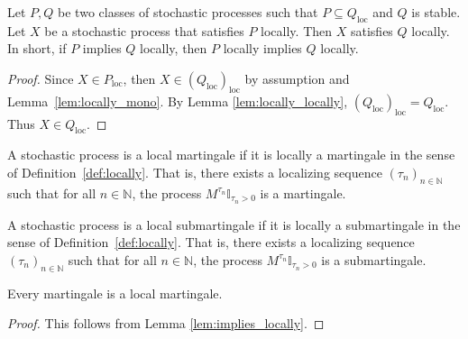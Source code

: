 \begin{lemma}\label{lem:local_induction}
  \leanok
Let $P, Q$ be two classes of stochastic processes such that $P \subseteq Q_{\mathrm{loc}}$ and $Q$ is stable.
Let $X$ be a stochastic process that satisfies $P$ locally.
Then $X$ satisfies $Q$ locally.
In short, if $P$ implies $Q$ locally, then $P$ locally implies $Q$ locally.
\end{lemma}

\begin{proof}\leanok
Since $X \in P_{\mathrm{loc}}$, then $X \in (Q_{\mathrm{loc}})_{\mathrm{loc}}$ by assumption and Lemma~\ref{lem:locally_mono}.
By Lemma \ref{lem:locally_locally}, $(Q_{\mathrm{loc}})_{\mathrm{loc}} = Q_{\mathrm{loc}}$.
Thus $X \in Q_{\mathrm{loc}}$.
\end{proof}


\begin{definition}\label{def:IsLocalMartingale}
  \leanok
A stochastic process is a local martingale if it is locally a martingale in the sense of Definition~\ref{def:locally}.
That is, there exists a localizing sequence $(\tau_n)_{n \in \mathbb{N}}$ such that for all $n \in \mathbb{N}$, the process $M^{\tau_n}\mathbb{I}_{\tau_n > 0}$ is a martingale.
\end{definition}


\begin{definition}\label{def:IsLocalSubmartingale}
  \leanok
A stochastic process is a local submartingale if it is locally a submartingale in the sense of Definition~\ref{def:locally}.
That is, there exists a localizing sequence $(\tau_n)_{n \in \mathbb{N}}$ such that for all $n \in \mathbb{N}$, the process $M^{\tau_n}\mathbb{I}_{\tau_n > 0}$ is a submartingale.
\end{definition}


\begin{lemma}\label{lem:Martingale.IsLocalMartingale}
  \leanok
Every martingale is a local martingale.
\end{lemma}

\begin{proof}\leanok
This follows from Lemma \ref{lem:implies_locally}.
\end{proof}



